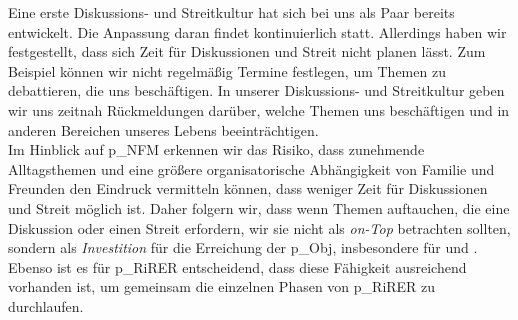 Eine erste Diskussions- und Streitkultur hat sich bei uns als Paar bereits entwickelt. Die Anpassung daran findet kontinuierlich statt. Allerdings haben wir festgestellt, dass sich Zeit für Diskussionen und Streit nicht planen lässt. Zum Beispiel können wir nicht regelmäßig Termine festlegen, um Themen zu debattieren, die uns beschäftigen. In unserer Diskussions- und Streitkultur geben wir uns zeitnah Rückmeldungen darüber, welche Themen uns beschäftigen und in anderen Bereichen unseres Lebens beeinträchtigen.\\


Im Hinblick auf \gls{p_NFM} erkennen wir das Risiko, dass zunehmende Alltagsthemen und eine größere organisatorische Abhängigkeit von Familie und Freunden den Eindruck vermitteln können, dass weniger Zeit für Diskussionen und Streit möglich ist. Daher folgern wir, dass wenn Themen auftauchen, die eine Diskussion oder einen Streit erfordern, wir sie nicht als \textit{on-Top} betrachten sollten, sondern als \textit{Investition} für die Erreichung der \gls{p_Obj}, insbesondere für \NFMOOne und \NFMOThree. Ebenso ist es für \gls{p_RiRER} entscheidend, dass diese Fähigkeit ausreichend vorhanden ist, um gemeinsam die einzelnen Phasen von \gls{p_RiRER} zu durchlaufen.